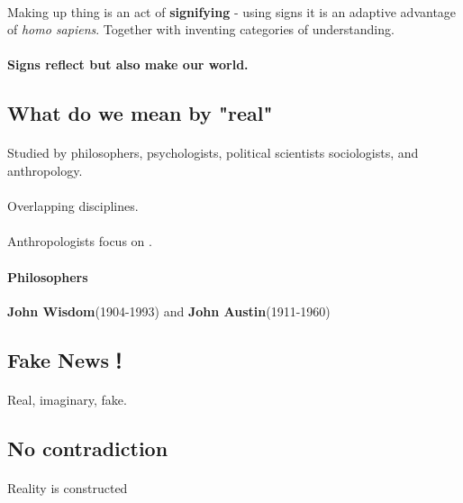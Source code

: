 \documentclass{article}
\begin{document}
	\paragraph{} Making up thing is an act of \textbf{signifying} - using signs it is an adaptive advantage of \emph{homo sapiens}. Together with inventing categories of understanding.
	\paragraph{} \textbf{Signs reflect but also make our world.}
	
	\subsection{What do we mean by "real"}
	\paragraph{} Studied by philosophers, psychologists, political scientists sociologists, and anthropology.
	\paragraph{} Overlapping disciplines.
	\paragraph{} Anthropologists focus on .
	\paragraph{Philosophers} \textbf{John Wisdom}(1904-1993) and \textbf{John Austin}(1911-1960)
	
	\subsection{Fake News！}
	\paragraph{} Real, imaginary, fake.
	
	\subsection{No contradiction}
	\paragraph{} Reality is constructed
\end{document}
